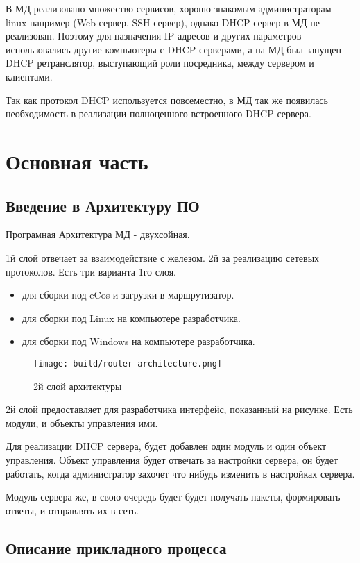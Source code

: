 \documentclass[14pt]{extarticle}
\begin{document}
В МД реализовано множество сервисов, хорошо знакомым администраторам linux например (Web сервер, SSH сервер), однако DHCP сервер в МД не реализован. Поэтому для назначения IP адресов и других параметров использовались другие компьютеры с DHCP серверами, а на МД был запущен DHCP ретранслятор, выступающий роли посредника, между сервером и клиентами.

Так как протокол DHCP используется повсеместно, в МД так же появилась необходимость в реализации полноценного встроенного DHCP сервера.

\pagebreak
\section{Основная часть}

\subsection{Введение в Архитектуру ПО}

Програмная Архитектура МД - двухсойная.

1й слой отвечает за взаимодействие с железом. 2й за реализацию сетевых протоколов.
Есть три варианта 1го слоя.

\begin{itemize}
    \item для сборки под eCos и загрузки в маршрутизатор.
    \item для сборки под Linux на компьютере разработчика.
    \item для сборки под Windows на компьютере разработчика.
\end{itemize}

\begin{figure}[H]
    \texttt{[image: build/router-architecture.png]}
    \caption{2й слой архитектуры}
\end{figure}

2й слой предоставляет для разработчика интерфейс, показанный на рисунке.
Есть модули, и объекты управления ими.

Для реализации DHCP сервера, будет добавлен один модуль и один объект управления.
Объект управления будет отвечать за настройки сервера, он будет работать, когда администратор захочет что нибудь изменить в настройках сервера.

Модуль сервера же, в свою очередь будет будет получать пакеты, формировать ответы, и отправлять их в сеть.

\subsection{Описание прикладного процесса}
\end{document}
